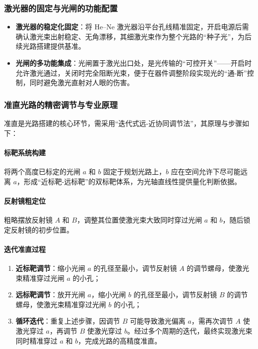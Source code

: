 \documentclass[11pt]{article}
\begin{document}
\subsubsection{激光器的固定与光闸的功能配置}
\begin{itemize}
  \item \textbf{激光器的稳定化固定}：将 He--Ne 激光器沿平台孔线精准固定，开启电源后需确认激光束出射稳定、无角漂移，其细激光束作为整个光路的“种子光”，为后续光路搭建提供基准。
  \item \textbf{光闸的多功能集成}：光闸置于激光出口处，是光传输的“可控开关”——开启时允许激光通过，关闭时完全阻断光束，便于在器件调整阶段实现光的“通-断”控制，同时避免激光直射对人眼的伤害。
\end{itemize}


\subsubsection{准直光路的精密调节与专业原理}

准直是光路搭建的核心环节，需采用“迭代式远-近协同调节法”，其原理与步骤如下：

\paragraph{标靶系统构建}
将两个高度已标定的光闸 $a$ 和 $b$ 固定于规划光路上，$b$ 应在空间允许下尽可能远离 $a$，形成“近标靶-远标靶”的双标靶体系，为光轴直线性提供量化判断依据。

\paragraph{反射镜粗定位}
粗略摆放反射镜 $A$ 和 $B$，调整其位置使激光束大致同时穿过光闸 $a$ 和 $b$，随后锁定反射镜的初步位置。

\paragraph{迭代准直过程}
\begin{enumerate}
  \item \textbf{近标靶调节}：缩小光闸 $a$ 的孔径至最小，调节反射镜 $A$ 的调节螺母，使激光束精准穿过光闸 $a$ 的小孔；
  \item \textbf{远标靶调节}：放开光闸 $a$，缩小光闸 $b$ 的孔径至最小，调节反射镜 $B$ 的调节螺母，使激光束精准穿过光闸 $b$ 的小孔；
  \item \textbf{循环迭代}：重复上述步骤，因调节 $B$ 可能导致激光偏离 $a$，需再次调节 $A$ 使激光穿过 $a$，再调节 $B$ 使激光穿过 $b$。经过多个周期的迭代，最终实现激光束同时精准穿过 $a$ 和 $b$，完成光路的高精度准直。
\end{enumerate}
\end{document}
